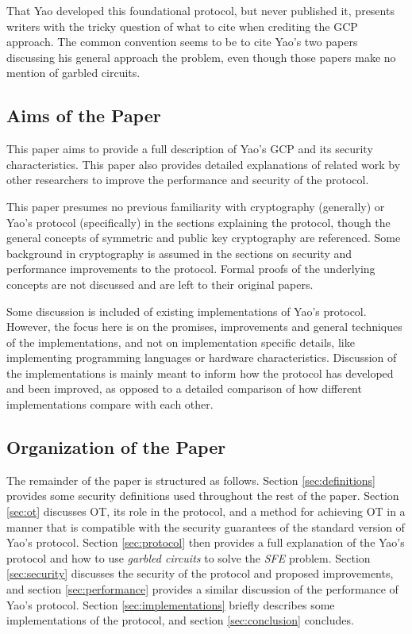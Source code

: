 That Yao developed this foundational protocol, but never published it, presents writers with the tricky question of what to cite when crediting the \ac{GCP} approach.  The common convention seems to be to cite Yao's two papers discussing his general approach the problem, even though those papers make no mention of garbled circuits.

\subsection{Aims of the Paper}

This paper aims to provide a full description of Yao's \ac{GCP} and its security characteristics.  This paper also provides detailed explanations of related work  by other researchers to improve the performance and security of the protocol.

This paper presumes no previous familiarity with cryptography (generally) or Yao's protocol (specifically) in the sections explaining the protocol, though the general concepts of symmetric and public key cryptography are referenced.  Some background in cryptography is assumed in the sections on security and performance improvements to the protocol.  Formal proofs of the underlying concepts are not discussed and are left to their original papers.

Some discussion is included of existing implementations of Yao's protocol. However, the focus here is on the promises, improvements and general techniques of the implementations, and not on implementation specific details, like implementing programming languages or hardware characteristics. Discussion of the implementations is mainly meant to inform how the protocol has developed and been improved, as opposed to a detailed comparison of how different implementations compare with each other.
\
\subsection{Organization of the Paper}

The remainder of the paper is structured as follows. Section \ref{sec:definitions} provides some security definitions used throughout the rest of the paper. Section \ref{sec:ot} discusses \ac{OT}, its role in the protocol, and a method for achieving \ac{OT} in a manner that is compatible with the security guarantees of the standard version of Yao's protocol.  Section \ref{sec:protocol} then provides a full explanation of the Yao's protocol and how to use \emph{garbled circuits} to solve the \emph{SFE} problem. Section \ref{sec:security} discusses the security of the protocol and proposed improvements, and section \ref{sec:performance} provides a similar discussion of the performance of Yao's protocol. Section \ref{sec:implementations} briefly describes some implementations of the protocol, and section \ref{sec:conclusion} concludes.
